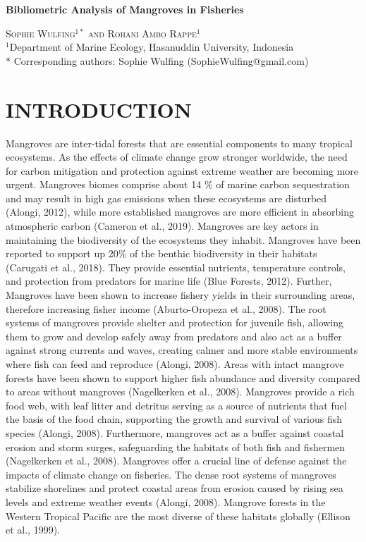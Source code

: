 \documentclass[
  12pt,
]{article}
\author{}
\date{\vspace{-2.5em}}
\begin{document}
\doublespacing

\begin{center}
    
\textbf{\Large Bibliometric Analysis of Mangroves in Fisheries}
    
\textsc{Sophie Wulfing$^{1*}$ and Rohani Ambo Rappe$^{1}$\\}
\vspace{3 mm}
\normalsize{\indent $^1$Department of Marine Ecology, Hasanuddin University, Indonesia\\}
$\text{*}$ Corresponding authors: Sophie Wulfing (SophieWulfing@gmail.com)
\end{center}

\newpage

\hypertarget{introduction}{%
\section{INTRODUCTION}\label{introduction}}

Mangroves are inter-tidal forests that are essential components to many tropical ecosystems. As the effects of climate change grow stronger worldwide, the need for carbon mitigation and protection against extreme weather are becoming more urgent. Mangroves biomes comprise about 14 \% of marine carbon sequestration and may result in high gas emissions when these ecosystems are disturbed (Alongi, 2012), while more established mangroves are more efficient in absorbing atmospheric carbon (Cameron et al., 2019). Mangroves are key actors in maintaining the biodiversity of the ecosystems they inhabit. Mangroves have been reported to support up 20\% of the benthic biodiversity in their habitats (Carugati et al., 2018). They provide essential nutrients, temperature controls, and protection from predators for marine life (Blue Forests, 2012). Further, Mangroves have been shown to increase fishery yields in their surrounding areas, therefore increasing fisher income (Aburto-Oropeza et al., 2008). The root systems of mangroves provide shelter and protection for juvenile fish, allowing them to grow and develop safely away from predators and also act as a buffer against strong currents and waves, creating calmer and more stable environments where fish can feed and reproduce (Alongi, 2008). Areas with intact mangrove forests have been shown to support higher fish abundance and diversity compared to areas without mangroves (Nagelkerken et al., 2008). Mangroves provide a rich food web, with leaf litter and detritus serving as a source of nutrients that fuel the basis of the food chain, supporting the growth and survival of various fish species (Alongi, 2008). Furthermore, mangroves act as a buffer against coastal erosion and storm surges, safeguarding the habitats of both fish and fishermen (Nagelkerken et al., 2008). Mangroves offer a crucial line of defense against the impacts of climate change on fisheries. The dense root systems of mangroves stabilize shorelines and protect coastal areas from erosion caused by rising sea levels and extreme weather events (Alongi, 2008). Mangrove forests in the Western Tropical Pacific are the most diverse of these habitats globally (Ellison et al., 1999).
\end{document}
